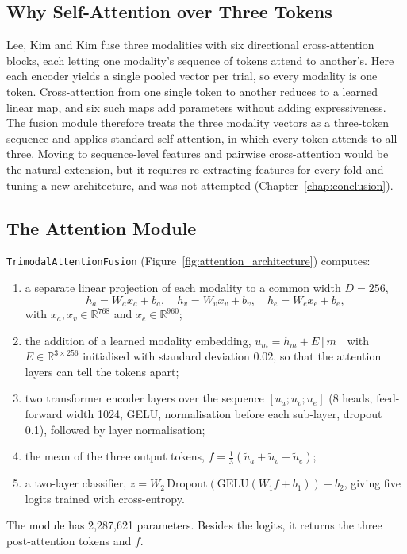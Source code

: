 \subsection{Why Self-Attention over Three Tokens}
\label{sec:fusion_design_rationale}
Lee, Kim and Kim \cite{Lee2024MERCL} fuse three modalities with six directional cross-attention blocks, each letting one modality's sequence of tokens attend to another's. Here each encoder yields a single pooled vector per trial, so every modality is one token. Cross-attention from one single token to another reduces to a learned linear map, and six such maps add parameters without adding expressiveness. The fusion module therefore treats the three modality vectors as a three-token sequence and applies standard self-attention, in which every token attends to all three. Moving to sequence-level features and pairwise cross-attention would be the natural extension, but it requires re-extracting features for every fold and tuning a new architecture, and was not attempted (Chapter~\ref{chap:conclusion}).

\subsection{The Attention Module}
\texttt{TrimodalAttentionFusion} (Figure~\ref{fig:attention_architecture}) computes:
\begin{enumerate}
    \item a separate linear projection of each modality to a common width $D = 256$,
    \begin{equation}
        h_a = W_a x_a + b_a, \quad h_v = W_v x_v + b_v, \quad h_e = W_e x_e + b_e,
    \end{equation}
    with $x_a, x_v \in \mathbb{R}^{768}$ and $x_e \in \mathbb{R}^{960}$;
    \item the addition of a learned modality embedding, $u_m = h_m + E[m]$ with $E \in \mathbb{R}^{3\times256}$ initialised with standard deviation 0.02, so that the attention layers can tell the tokens apart;
    \item two transformer encoder layers over the sequence $[u_a; u_v; u_e]$ (8 heads, feed-forward width 1024, GELU, normalisation before each sub-layer, dropout 0.1), followed by layer normalisation;
    \item the mean of the three output tokens, $f = \tfrac{1}{3}(\tilde u_a + \tilde u_v + \tilde u_e)$;
    \item a two-layer classifier, $z = W_2\,\mathrm{Dropout}(\mathrm{GELU}(W_1 f + b_1)) + b_2$, giving five logits trained with cross-entropy.
\end{enumerate}
The module has 2{,}287{,}621 parameters. Besides the logits, it returns the three post-attention tokens and $f$.

